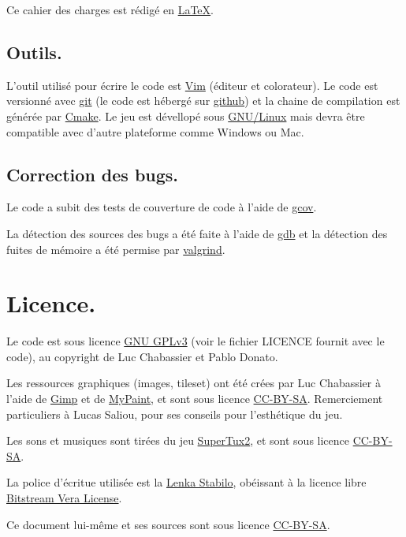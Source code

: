 \documentclass{article}
\begin{document}
Ce cahier des charges est rédigé en \href{http://www.latex-project.org/}{\LaTeX}.

\subsection{Outils.}
L'outil utilisé pour écrire le code est \href{http://www.vim.org/}{Vim} (éditeur et colorateur). Le code est versionné avec \href{http://git-scm.com/}{git} (le code est hébergé sur \href{https://github.com/Lycee/ISN\_snake}{github}) et la chaine de compilation est générée par \href{http://www.cmake.org/}{Cmake}. Le jeu est dévellopé sous \href{https://en.wikipedia.org/wiki/Linux}{GNU/Linux} mais devra être compatible avec d'autre plateforme comme Windows ou Mac.

\subsection{Correction des bugs.}
Le code a subit des tests de couverture de code à l'aide de \href{http://gcc.gnu.org/onlinedocs/gcc-4.5.2/gcc/Gcov.html#Gcov}{gcov}.

La détection des sources des bugs a été faite à l'aide de \href{https://www.gnu.org/software/gdb/}{gdb} et la détection des fuites de mémoire a été permise par \href{http://www.valgrind.org/}{valgrind}.

\section{Licence.}
Le code est sous licence \href{http://gplv3.fsf.org/}{GNU GPLv3} (voir le fichier LICENCE fournit avec le code), au copyright de Luc Chabassier et Pablo Donato.

Les ressources graphiques (images, tileset) ont été crées par Luc Chabassier à l'aide de \href{http://www.gimp.org/}{Gimp} et de \href{http://mypaint.intilinux.com/}{MyPaint}, et sont sous licence \href{https://creativecommons.org/licenses/by-sa/2.0/}{CC-BY-SA}. Remerciement particuliers à Lucas Saliou, pour ses conseils pour l'esthétique du jeu.

Les sons et musiques sont tirées du jeu \href{http://supertux.lethargik.org/}{SuperTux2}, et sont sous licence \href{https://creativecommons.org/licenses/by-sa/2.0/}{CC-BY-SA}.

La police d'écritue utilisée est la \href{http://openfontlibrary.org/en/font/lenka-stabilo}{Lenka Stabilo}, obéissant à la licence libre \href{http://www-old.gnome.org/fonts/}{Bitstream Vera License}.

Ce document lui-même et ses sources sont sous licence \href{https://creativecommons.org/licenses/by-sa/2.0/}{CC-BY-SA}.
\end{document}

